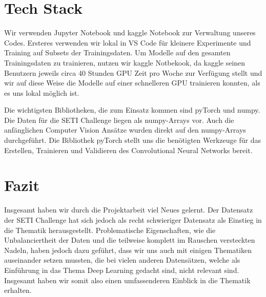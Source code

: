\documentclass[12pt, a4paper]{article}
\begin{document}
\section{Tech Stack}
Wir verwenden Jupyter Notebook und kaggle Notebook zur Verwaltung unseres Codes. Ersteres verwenden wir lokal in VS Code für kleinere Experimente und Training auf Subsets der Trainingsdaten. Um Modelle auf den gesamten Trainingsdaten zu trainieren, nutzen wir kaggle Notbekook, da kaggle seinen Benutzern jeweils circa 40 Stunden GPU Zeit pro Woche zur Verfügung stellt und wir auf diese Weise die Modelle auf einer schnelleren GPU trainieren konnten, als es uns lokal möglich ist.

Die wichtigsten Bibliotheken, die zum Einsatz kommen sind pyTorch und numpy. Die Daten für die SETI Challenge liegen als numpy-Arrays vor. Auch die anfänglichen Computer Vision Ansätze wurden direkt auf den numpy-Arrays durchgeführt. Die Bibliothek pyTorch stellt uns die benötigten Werkzeuge für das Erstellen, Trainieren und Validieren des Convolutional Neural Networks bereit.

\section{Fazit}
Insgesamt haben wir durch die Projektarbeit viel Neues gelernt. Der Datensatz der SETI Challenge hat sich jedoch als recht schwieriger Datensatz als Einstieg in die Thematik herausgestellt. Problematische Eigenschaften, wie die Unbalanciertheit der Daten und die teilweise komplett im Rauschen versteckten Nadeln, haben jedoch dazu geführt, dass wir uns auch mit einigen Thematiken auseinander setzen mussten, die bei vielen anderen Datensätzen, welche als Einführung in das Thema Deep Learning gedacht sind, nicht relevant sind. Insgesamt haben wir somit also einen umfassenderen Einblick in die Thematik erhalten.

\newpage


\end{document}
